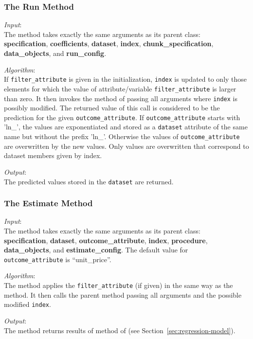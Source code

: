 \subsubsection{The Run Method}
%
{\it Input}:\\[1mm]
The  method takes exactly the same arguments as its parent
class:\\
{\bf specification}, {\bf coefficients}, {\bf dataset}, {\bf index}, {\bf
  chunk_specification}, {\bf data_objects}, and {\bf run_config}.

{\it Algorithm}:\\[1mm]
If \verb|filter_attribute| is given in the initialization, \verb|index| is
updated to only those elements for which the value of
attribute/variable \verb|filter_attribute| is
larger than zero. It then invokes the  method of
 passing all arguments where
\verb|index| is possibly modified. The returned value of this call
is considered to be the prediction for the given \verb|outcome_attribute|.
If \verb|outcome_attribute| starts with 'ln_', the values are exponentiated 
and stored as a \verb|dataset| attribute of the same name but without the prefix 'ln_'.
Otherwise the values of \verb|outcome_attribute| are overwritten by the new values. 
Only values are overwritten that correspond to dataset members given by index.

{\it Output}:\\[1mm]
The predicted values stored in the \verb|dataset| are returned. 

\subsubsection{The Estimate Method}
{\it Input}:\\[1mm]
The  method takes exactly the same arguments as its parent
class: \\
{\bf specification}, {\bf dataset}, {\bf outcome_attribute}, {\bf index}, {\bf
  procedure}, {\bf data_objects}, and {\bf estimate_config}. The default value 
for \verb|outcome_attribute| is ``unit_price''.

{\it Algorithm}:\\[1mm]
The method applies the \verb|filter_attribute| (if given) in the same way as the
 method. It then calls the parent method 
passing all arguments and the possible modified \verb|index|.

{\it Output}:\\[1mm]
The method returns results of  method of
 (see Section~\ref{sec:regression-model}).

